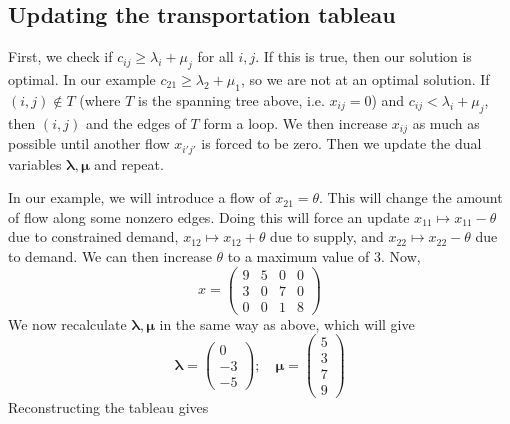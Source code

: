 \subsection{Updating the transportation tableau}
First, we check if \( c_{ij} \geq \lambda_i + \mu_j \) for all \( i, j \).
If this is true, then our solution is optimal.
In our example \( c_{21} \geq \lambda_2 + \mu_1 \), so we are not at an optimal solution.
If \( (i,j) \notin T \) (where \( T \) is the spanning tree above, i.e.
\( x_{ij} = 0 \)) and \( c_{ij} < \lambda_i + \mu_j \), then \((i,j)\) and the edges of \( T \) form a loop.
We then increase \( x_{ij} \) as much as possible until another flow \(x_{i'j'}\) is forced to be zero.
Then we update the dual variables \( \bm \lambda, \bm \mu \) and repeat.

In our example, we will introduce a flow of \( x_{21} = \theta \).
This will change the amount of flow along some nonzero edges.
Doing this will force an update \( x_{11} \mapsto x_{11} - \theta \) due to constrained demand, \( x_{12} \mapsto x_{12} + \theta \) due to supply, and \( x_{22} \mapsto x_{22} - \theta \) due to demand.
We can then increase \( \theta \) to a maximum value of \( 3 \).
Now,
\[
	x = \begin{pmatrix}
		9 & 5 & 0 & 0 \\
		3 & 0 & 7 & 0 \\
		0 & 0 & 1 & 8
	\end{pmatrix}
\]
We now recalculate \( \bm\lambda,\bm\mu \) in the same way as above, which will give
\[
	\bm\lambda = \begin{pmatrix}
		0 \\-3\\-5
	\end{pmatrix};\quad \bm\mu = \begin{pmatrix}
		5 \\3\\7\\9
	\end{pmatrix}
\]
Reconstructing the tableau gives
